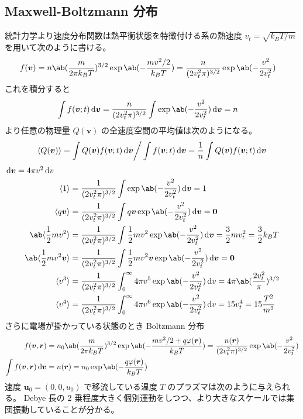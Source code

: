 \documentclass[a4paper,11pt]{jlreq}
\begin{document}
\subsection{Maxwell-Boltzmann 分布}
統計力学より速度分布関数は熱平衡状態を特徴付ける系の熱速度 $v_t = \sqrt{k_BT/m}$ を用いて次のように書ける。
\begin{align}
  f(\bm{v}) & = n\ab(\frac{m}{2\pi k_BT})^{3/2}\exp\ab(-\frac{mv^2/2}{k_BT}) = \frac{n}{(2v_t^2\pi)^{3/2}}\exp\ab(-\frac{v^2}{2v_t^2})
\end{align}
これを積分すると
\begin{align}
  \int f(\bm{v}; t)\dl{\bm{v}} & = \frac{n}{(2v_t^2\pi)^{3/2}}\int\exp\ab(-\frac{v^2}{2v_t^2})\dl{\bm{v}} = n
\end{align}
より任意の物理量 $Q(\bm{v})$ の全速度空間の平均値は次のようになる。
\begin{align}
  \langle Q(\bm{v}) \rangle = \int Q(\bm{v})f(\bm{v}; t)\dl{\bm{v}}\bigg/ \int f(\bm{v}; t)\dl{\bm{v}} = \frac{1}{n}\int Q(\bm{v})f(\bm{v}; t)\dl{\bm{v}}
\end{align}
$\dl{\bm{v}} = 4\pi v^2\dl{v}$
\begin{align}
  \langle 1\rangle                        & = \frac{1}{(2v_t^2\pi)^{3/2}}\int\exp\ab(-\frac{v^2}{2v_t^2})\dl{\bm{v}} = 1                                                  \\
  \langle q\bm{v}\rangle                  & = \frac{1}{(2v_t^2\pi)^{3/2}}\int q\bm{v}\exp\ab(-\frac{v^2}{2v_t^2})\dl{\bm{v}} = \bm{0}                                     \\
  \ab\langle \frac{1}{2}mv^2\rangle       & = \frac{1}{(2v_t^2\pi)^{3/2}}\int\frac{1}{2}mv^2\exp\ab(-\frac{v^2}{2v_t^2})\dl{\bm{v}} = \frac{3}{2}mv_t^2 = \frac{3}{2}k_BT \\
  \ab\langle \frac{1}{2}mv^2\bm{v}\rangle & = \frac{1}{(2v_t^2\pi)^{3/2}}\int\frac{1}{2}mv^2\bm{v}\exp\ab(-\frac{v^2}{2v_t^2})\dl{\bm{v}} = \bm{0}                        \\
  \langle v^3\rangle                      & = \frac{1}{(2v_t^2\pi)^{3/2}}\int_0^\infty 4\pi v^5\exp\ab(-\frac{v^2}{2v_t^2})\dl{v} = 4\pi\ab(\frac{2v_t^2}{\pi})^{3/2}     \\
  \langle v^4\rangle                      & = \frac{1}{(2v_t^2\pi)^{3/2}}\int_0^\infty 4\pi v^6\exp\ab(-\frac{v^2}{2v_t^2})\dl{v} = 15v_t^4 = 15\frac{T^2}{m^2}
\end{align}
さらに電場が掛かっている状態のとき Boltzmann 分布
\begin{align}
  f(\bm{v}, \rr)                 & = n_0\ab(\frac{m}{2\pi k_BT})^{3/2}\exp\ab(-\frac{mv^2/2 + q\varphi(\rr)}{k_BT}) = \frac{n(\rr)}{(2v_t^2\pi)^{3/2}}\exp\ab(-\frac{v^2}{2v_t^2}) \\
  \int f(\bm{v}, \rr)\dl{\bm{v}} & = n(\rr) = n_0\exp\ab(-\frac{q\varphi(\rr)}{k_BT})
\end{align}
速度 $\bm{u}_0 = (0, 0, u_0)$ で移流している温度 $T$ のプラズマは次のように与えられる。
Debye 長の 2 乗程度大きく個別運動をしつつ、より大きなスケールでは集団振動していることが分かる。
\end{document}
